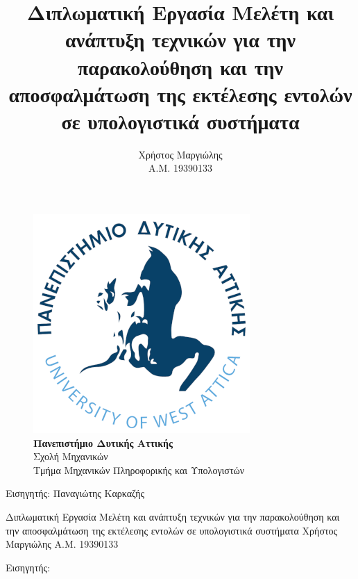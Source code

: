 \documentclass[12pt]{article}
\title{Διπλωματική Εργασία
\linebreak
\linebreak
Μελέτη και ανάπτυξη τεχνικών για την παρακολούθηση και την αποσφαλμάτωση της
εκτέλεσης εντολών σε υπολογιστικά συστήματα}
\author{Χρήστος Μαργιώλης \\ Α.Μ. 19390133}
\date{}
\begin{document}
\begin{titlepage}
        \maketitle
        \begin{figure}[t!]
        \begin{center}
        \includegraphics[scale=0.3]{./res/uniwalogo.png} \\
        \Large
	\textbf{Πανεπιστήμιο Δυτικής Αττικής} \\
        \large
	Σχολή Μηχανικών \\
        Τμήμα Μηχανικών Πληροφορικής και Υπολογιστών \\
        \end{center}
        \end{figure}
        \begin{center}
	Εισηγητής: Παναγιώτης Καρκαζής %
        \end{center}
\end{titlepage}

\shipout\null

\begin{center}
Διπλωματική Εργασία
\linebreak
\linebreak
Μελέτη και ανάπτυξη τεχνικών για την παρακολούθηση και την αποσφαλμάτωση της
εκτέλεσης εντολών σε υπολογιστικά συστήματα
\linebreak
\linebreak
Χρήστος Μαργιώλης
\linebreak
Α.Μ. 19390133
\end{center}

Εισηγητής:
\end{document}
